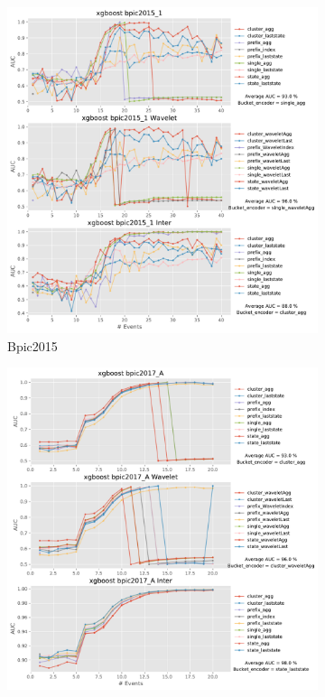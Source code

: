 \documentclass[twoside,11pt]{Latex/Classes/PhDthesisPSnPDF}
\begin{document}
\begin{figure}[!htbp]
\begin{subfigure}{0.48\textwidth}
		\includegraphics[width=\linewidth]{images/inter/xgboost/bpic2015_1.pdf}
		\caption{Bpic2015} \label{fig:b151i}
	\end{subfigure}	
	\begin{subfigure}{0.48\textwidth}
		\includegraphics[width=\linewidth]{images/inter/xgboost/bpic2017_A.pdf}

\end{subfigure}
\end{figure}
\end{document}
